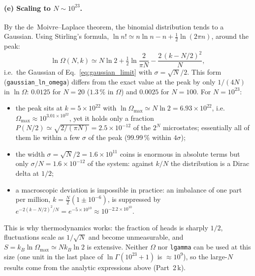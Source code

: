 \paragraph{(e) Scaling to $N\sim10^{23}$.} By the de~Moivre--Laplace theorem, the binomial distribution tends to a Gaussian. Using Stirling's formula, $\ln n!\simeq n\ln n-n+\tfrac12\ln(2\pi n)$, around the peak:
\begin{equation}
\ln\Omega(N,k)\simeq N\ln2+\tfrac12\ln\frac{2}{\pi N}-\frac{2\,(k-N/2)^2}{N},
\end{equation}
i.e.\ the Gaussian of Eq.~\eqref{eq:gaussian_limit} with $\sigma=\sqrt N/2$. This form (\texttt{gaussian\_ln\_omega}) differs from the exact value at the peak by only $1/(4N)$ in $\ln\Omega$: $0.0125$ for $N=20$ ($1.3\,\%$ in $\Omega$) and $0.0025$ for $N=100$. For $N=10^{23}$:
\begin{itemize}
\item the peak sits at $k=5\times10^{22}$ with $\ln\Omega_{\max}\simeq N\ln2=6.93\times10^{22}$, i.e.\ $\Omega_{\max}\approx10^{3.01\times10^{22}}$, yet it holds only a fraction $P(N/2)\simeq\sqrt{2/(\pi N)}=2.5\times10^{-12}$ of the $2^N$ microstates; essentially all of them lie within a few $\sigma$ of the peak (99.99\,\% within $4\sigma$);
\item the width $\sigma=\sqrt N/2=1.6\times10^{11}$ coins is enormous in absolute terms but only $\sigma/N=1.6\times10^{-12}$ of the system: against $k/N$ the distribution is a Dirac delta at $1/2$;
\item a macroscopic deviation is impossible in practice: an imbalance of one part per million, $k=\tfrac N2(1\pm10^{-6})$, is suppressed by $e^{-2(k-N/2)^2/N}=e^{-5\times10^{10}}\approx10^{-2.2\times10^{10}}$.
\end{itemize}
This is why thermodynamics works: the fraction of heads is sharply $1/2$, fluctuations scale as $1/\sqrt N$ and become unmeasurable, and $S=k_B\ln\Omega_{\max}\simeq Nk_B\ln2$ is extensive. Neither $\Omega$ nor \texttt{lgamma} can be used at this size (one unit in the last place of $\ln\Gamma(10^{23}+1)$ is $\approx10^9$), so the large-$N$ results come from the analytic expressions above (Part~2\,k).
